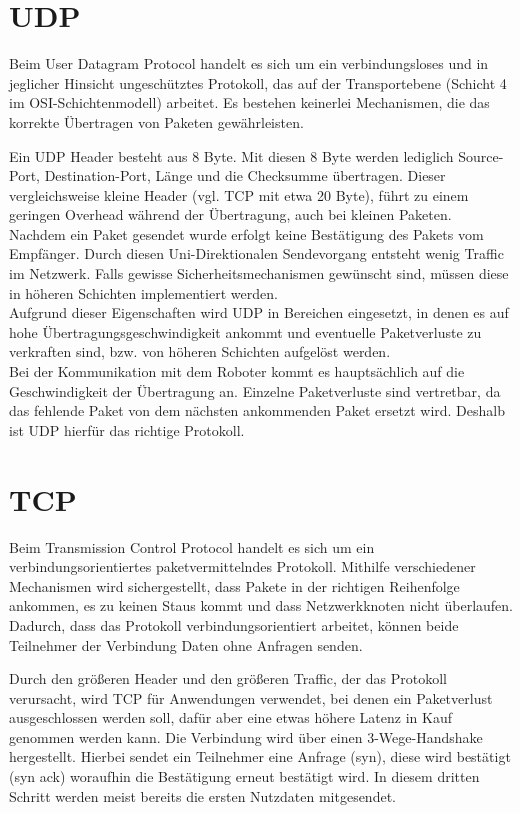 \section{UDP}
Beim User Datagram Protocol handelt es sich um ein verbindungsloses und in jeglicher Hinsicht ungeschütztes Protokoll, das auf der Transportebene (Schicht 4 im OSI-Schichtenmodell) arbeitet. Es bestehen keinerlei Mechanismen, die das korrekte Übertragen von Paketen gewährleisten. 

Ein UDP Header besteht aus 8 Byte. Mit diesen 8 Byte werden lediglich Source-Port, Destination-Port, Länge und die Checksumme übertragen. Dieser vergleichsweise kleine Header (vgl. TCP mit etwa 20 Byte), führt zu einem geringen Overhead während der Übertragung, auch bei kleinen Paketen. Nachdem ein Paket gesendet wurde erfolgt keine Bestätigung des Pakets vom Empfänger. Durch diesen Uni-Direktionalen Sendevorgang entsteht wenig Traffic im Netzwerk. Falls gewisse Sicherheitsmechanismen gewünscht sind, müssen diese in höheren Schichten implementiert werden. \\
Aufgrund dieser Eigenschaften wird UDP in Bereichen eingesetzt, in denen es auf hohe Übertragungsgeschwindigkeit ankommt und eventuelle Paketverluste zu verkraften sind, bzw. von höheren Schichten aufgelöst werden.\\

Bei der Kommunikation mit dem Roboter kommt es hauptsächlich auf die Geschwindigkeit der Übertragung an. Einzelne Paketverluste sind vertretbar, da das fehlende Paket von dem nächsten ankommenden Paket ersetzt wird. Deshalb ist UDP hierfür das richtige Protokoll.


\section{TCP}
Beim Transmission Control Protocol handelt es sich um ein verbindungsorientiertes paketvermittelndes Protokoll. Mithilfe verschiedener Mechanismen wird sichergestellt, dass Pakete in der richtigen Reihenfolge ankommen, es zu keinen Staus kommt und dass Netzwerkknoten nicht überlaufen. Dadurch, dass das Protokoll verbindungsorientiert arbeitet, können beide Teilnehmer der Verbindung Daten ohne Anfragen senden. 

Durch den größeren Header und den größeren Traffic, der das Protokoll verursacht, wird TCP für Anwendungen verwendet, bei denen ein Paketverlust ausgeschlossen werden soll, dafür aber eine etwas höhere Latenz in Kauf genommen werden kann. 
Die Verbindung wird über einen 3-Wege-Handshake hergestellt. Hierbei sendet ein Teilnehmer eine Anfrage (syn), diese wird bestätigt (syn ack) woraufhin die Bestätigung erneut bestätigt wird. In diesem dritten Schritt werden meist bereits die ersten Nutzdaten mitgesendet.

